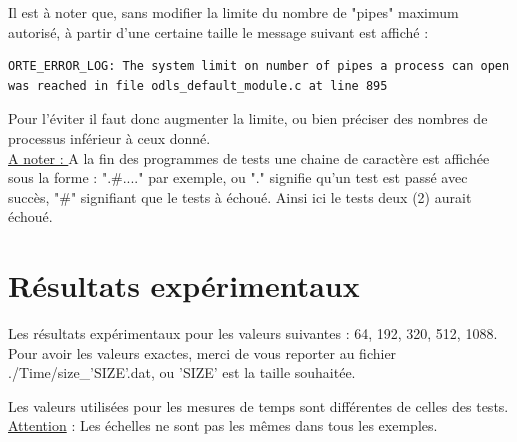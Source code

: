\documentclass[10pt,a4paper]{article}
\begin{document}
Il est à noter que, sans modifier la limite du nombre de "pipes" maximum autorisé, à partir d'une certaine taille le message suivant est affiché :
\begin{verbatim}
ORTE_ERROR_LOG: The system limit on number of pipes a process can open 
was reached in file odls_default_module.c at line 895
\end{verbatim}
Pour l'éviter il faut donc augmenter la limite, ou bien préciser des nombres de processus inférieur à ceux donné. \\

\underline{A noter : } A la fin des programmes de tests une chaine de caractère est affichée sous la forme : ".\#...." par exemple, ou "." signifie qu'un test est passé avec succès, "\#" signifiant que le tests à échoué. Ainsi ici le tests deux (2) aurait échoué.

\vspace{-0.2cm}
\section{Résultats expérimentaux}

Les résultats expérimentaux pour les valeurs suivantes : 64, 192, 320, 512, 1088. \\
Pour avoir les valeurs exactes, merci de vous reporter au fichier ./Time/size\_'SIZE'.dat, ou 'SIZE' est la taille souhaitée.

Les valeurs utilisées pour les mesures de temps sont différentes de celles des tests.\\
\underline{Attention} : Les échelles ne sont pas les mêmes dans tous les exemples.
\end{document}
